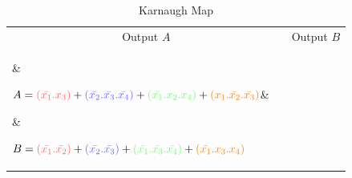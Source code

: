 \documentclass[11pt,a4paper,normalphoto,withhyper]{altareport}
\begin{document}
\begin{table}[h!]
	\begin{center}
    \caption{Karnaugh Map}
    \label{tab:example_Karnaugh_Map}
    \begin{tabular}{p{4cm} p{3.8cm} | p{4cm} p{3.8cm}}
    
      \multicolumn{2}{c}{Output $A$} & \multicolumn{2}{c}{{Output $B$}} \\
      \parbox[c]{5mm}{} &
      
      $ A = \textcolor{LightRed}{(\bar{x_1}.x_3)} 
      + \textcolor{LightBlue}{(\bar{x_2}.\bar{x_3}.\bar{x_4})} 
      + \textcolor{LightGreen}{(\bar{x_1}.x_2.x_4)} 
      + \textcolor{orange}{(x_1.\bar{x_2}.\bar{x_3})}$&
      
      
      \parbox[c]{5mm}{} &
      
      $ B = \textcolor{LightRed}{(\bar{x_1}.\bar{x_2})}
      + \textcolor{LightBlue}{(\bar{x_2}.\bar{x_3})} 
      + \textcolor{LightGreen}{(\bar{x_1}.\bar{x_3}.\bar{x_4})} 
      + \textcolor{orange}{(\bar{x_1}.x_3.x_4)}$ \\
      
      
      
      
       & \\
      \parbox[c]{5mm}{} &
      
      $ C = \textcolor{LightRed}{(\bar{x_1}.x_2)} 
      + \textcolor{LightBlue}{(\bar{x_2}.\bar{x_3})} 
      + \textcolor{LightGreen}{(\bar{x_1}.x_4)} 
      + \textcolor{orange}{(\bar{x_1}.\bar{x_3})}$ &
      

\end{tabular}
\end{center}
\end{table}
\end{document}
